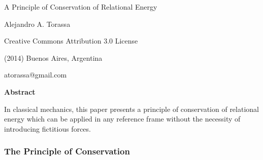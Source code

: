 \documentclass[10pt]{article}
\begin{document}
\begin{center}

{\Large A Principle of Conservation of Relational Energy}

\bigskip \medskip

Alejandro A. Torassa

\bigskip \medskip

\footnotesize

Creative Commons Attribution 3.0 License

(2014) Buenos Aires, Argentina

atorassa@gmail.com

\bigskip \smallskip

\small

{\bf Abstract}

\bigskip

\parbox{90mm}{In classical mechanics, this paper presents a principle of conservation of relational energy which can be applied in any reference frame without the necessity of introducing fictitious forces.}

\end{center}

\normalsize

\vspace{-0.30em}

{\centering\subsubsection*{The Principle of Conservation}}

\vspace{+0.90em}
\end{document}
